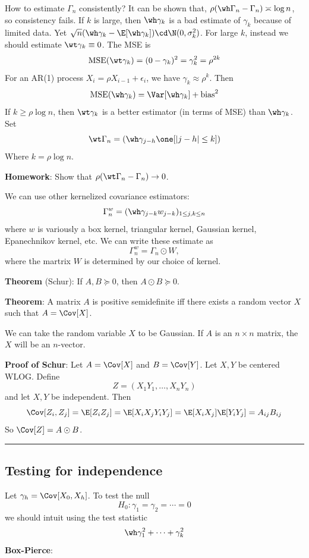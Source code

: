 How to estimate \(\Gamma_n\) consistently? It can be shown that, \(\rho(\wh \Gamma_n - \Gamma_n) \asymp \log n\), so consistency fails. If \(k\) is large, then \(\wh \gamma_k\) is a bad estimate of \(\gamma_k\) because of limited data. Yet \(\sqrt{n}(\wh \gamma_k - \E[\wh\gamma_k]) \cd \N(0, \sigma_k^2)\). For large \(k\), instead we should estimate \(\wt \gamma_k \equiv 0\). The MSE is
\[\text{MSE}(\wt\gamma_k) = (0 - \gamma_k)^2 = \gamma_k^2 = \rho^{2k}\]
For an AR(1) process \(X_i = \rho X_{i-1} + \epsilon_i\), we have \(\gamma_k \approx \rho^k\). Then
\[\text{MSE}(\wh \gamma_k) = \Var[\wh\gamma_k] + \text{bias}^2\]
If \(k \geq \rho \log n\), then \(\wt \gamma_k\) is a better estimator (in terms of MSE) than \(\wh \gamma_k\). Set
\[\wt \Gamma_n = (\wh\gamma_{j-h}\one[|j - h| \leq k])\]
Where \(k = \rho \log n\).

\textbf{Homework}: Show that \(\rho(\wt \Gamma_n - \Gamma_n) \to 0\).

We can use other kernelized covariance estimators:
\[\Gamma_n^w = (\wh \gamma_{j-k} w_{j-k})_{1 \leq j, k \leq n}\]
where \(w\) is variously a box kernel, triangular kernel, Gaussian kernel, Epanechnikov kernel, etc. We can write these estimate as
\[\Gamma_n^w = \Gamma_n \odot W,\]
where the martrix \(W\) is determined by our choice of kernel.

\textbf{Theorem} (Schur): If \(A, B \succeq 0\), then \(A \odot B \succeq 0\).

\textbf{Theorem}: A matrix \(A\) is positive semidefinite iff there exists a random vector \(X\) such that \(A = \Cov[X]\).

We can take the random variable \(X\) to be Gaussian. If \(A\) is an \(n \times n\) matrix, the \(X\) will be an \(n\)-vector.

\textbf{Proof of Schur}: Let \(A = \Cov[X]\) and \(B = \Cov[Y]\). Let \(X, Y\) be centered WLOG. Define
\[Z = (X_1 Y_1, \dots, X_n Y_n)\]
and let \(X, Y\) be independent. Then
\[\Cov[Z_i, Z_j] = \E[Z_i Z_j] = \E[X_i X_j Y_i Y_j] = \E[X_i X_j]\E[Y_i Y_j] = A_{ij}B_{ij}\]
So \(\Cov[Z] = A \odot B\).

\begin{center}\rule{0.5\linewidth}{0.5pt}\end{center}

\subsection*{Testing for independence}
Let \(\gamma_h = \Cov[X_0, X_h]\). To test the null
\[H_0: \gamma_1 = \gamma_2 = \cdots = 0\]
we should intuit using the test statistic
\[\wh \gamma_1^2 + \cdots + \gamma_k^2\]
\textbf{Box-Pierce}:

